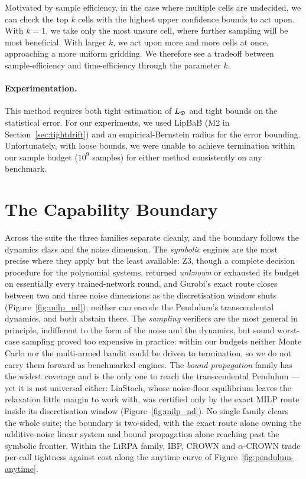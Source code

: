 Motivated by sample efficiency, in the case where multiple cells are undecided, we can check the top $k$ cells with the highest upper confidence bounds to act upon. With $k=1$, we take only the most unsure cell, where further sampling will be most beneficial. With larger $k$, we act upon more and more cells at once, approaching a more uniform gridding. We therefore see a tradeoff between sample-efficiency and time-efficiency through the parameter $k$.

\paragraph{Experimentation.} This method requires both tight estimation of $L_{\mathfrak{D}}$ and tight bounds on the statistical error. For our experiments, we used LipBaB (M2 in Section~\ref{sec:tightdrift}) and an empirical-Bernstein radius for the error bounding. Unfortunately, with loose bounds, we were unable to achieve termination within our sample budget ($10^9$ samples) for either method consistently on any benchmark.

\section{The Capability Boundary}
\label{sec:capability}

Across the suite the three families separate cleanly, and the boundary follows
the dynamics class and the noise dimension. The \emph{symbolic} engines are the
most precise where they apply but the least available: Z3, though a complete
decision procedure for the polynomial systems, returned \emph{unknown} or
exhausted its budget on essentially every trained-network round, and Gurobi's
exact route closes between two and three noise dimensions as the
discretisation window shuts (Figure~\ref{fig:milp_nd}); neither can encode the
$\mathrm{Pendulum}$'s transcendental dynamics, and both abstain there. The
\emph{sampling} verifiers are the most general in principle, indifferent to
the form of the noise and the dynamics, but sound worst-case sampling proved
too expensive in practice: within our budgets neither Monte Carlo nor the
multi-armed bandit could be driven to termination, so we do not carry them
forward as benchmarked engines. The \emph{bound-propagation} family has the
widest coverage and is the only one to reach the transcendental
$\mathrm{Pendulum}$ --- yet it is not universal either: $\mathrm{LinStoch}$,
whose noise-floor equilibrium leaves the relaxation little margin to work
with, was certified only by the exact MILP route inside its discretisation
window (Figure~\ref{fig:milp_nd}). No single family clears the whole suite;
the boundary is two-sided, with the exact route alone owning the additive-noise
linear system and bound propagation alone reaching past the symbolic frontier.
Within the LiRPA family, IBP, CROWN and $\alpha$-CROWN trade per-call
tightness against cost along the anytime curve of
Figure~\ref{fig:pendulum-anytime}.

